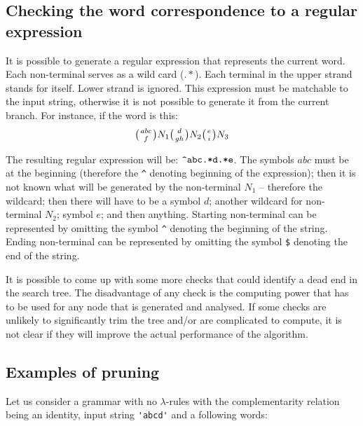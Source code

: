 \subsection{Checking the word correspondence to a regular expression}
It is possible to generate a regular expression that represents the current word. Each non-terminal serves as a wild card ($.*$). Each terminal in the upper strand stands for itself. Lower strand is ignored. This expression must be matchable to the input string, otherwise it is not possible to generate it from the current branch. For instance, if the word is this:
$$\wkpair{abc}{f}N_1\wkpair{d}{gh}N_2\wkpair{e}{i}N_3$$

The resulting regular expression will be: $\verb/^abc.*d.*e/$. The symbols $abc$ must be at the beginning (therefore the \verb/^/ denoting beginning of the expression); then it is not known what will be generated by the non-terminal $N_1$ -- therefore the wildcard; then there will have to be a symbol $d$; another wildcard for non-terminal $N_2$; symbol $e$; and then anything. Starting non-terminal can be represented by omitting the symbol \verb/^/ denoting the beginning of the string. Ending non-terminal can be represented by omitting the symbol \verb/$/ denoting the end of the string.

It is possible to come up with some more checks that could identify a dead end in the search tree. The disadvantage of any check is the computing power that has to be used for any node that is generated and analysed. If some checks are unlikely to significantly trim the tree and/or are complicated to compute, it is not clear if they will improve the actual performance of the algorithm.

\subsection{Examples of pruning}
Let us consider a grammar with no $\lambda$-rules with the complementarity relation being an identity, input string \verb/'abcd'/  and a following words:

